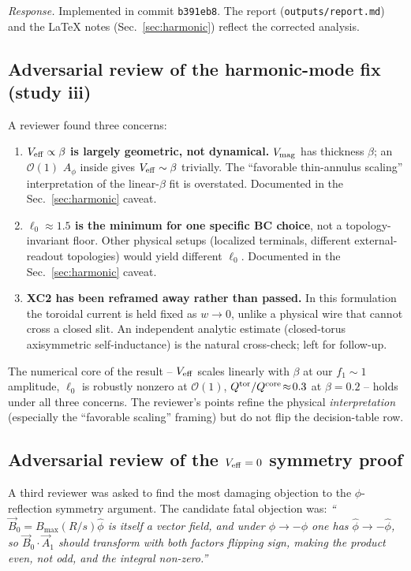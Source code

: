 \documentclass[11pt]{article}
\begin{document}
\emph{Response.}  Implemented in commit \texttt{b391eb8}.  The
report (\texttt{outputs/report.md}) and the LaTeX notes
(Sec.~\ref{sec:harmonic}) reflect the corrected analysis.

\subsection*{Adversarial review of the harmonic-mode fix (study iii)}

A reviewer found three concerns:
\begin{enumerate}
\item \textbf{$V_{\rm eff}\propto\beta$ is largely geometric, not
dynamical.}  $V_{\rm mag}$ has thickness $\beta$; an $\mathcal O(1)$
$A_\phi$ inside gives $V_{\rm eff}\sim\beta$ trivially.  The
``favorable thin-annulus scaling'' interpretation of the linear-$\beta$
fit is overstated.  Documented in the Sec.~\ref{sec:harmonic} caveat.
\item \textbf{$\ell_0\approx 1.5$ is the minimum for one specific
BC choice}, not a topology-invariant floor.  Other physical setups
(localized terminals, different external-readout topologies) would
yield different $\ell_0$.  Documented in the Sec.~\ref{sec:harmonic}
caveat.
\item \textbf{XC2 has been reframed away rather than passed.}  In
this formulation the toroidal current is held fixed as $w\to 0$,
unlike a physical wire that cannot cross a closed slit.  An
independent analytic estimate (closed-torus axisymmetric
self-inductance) is the natural cross-check; left for follow-up.
\end{enumerate}

The numerical core of the result -- $V_{\rm eff}$ scales linearly
with $\beta$ at our $f_1\!\sim\!1$ amplitude, $\ell_0$ is robustly
nonzero at $\mathcal O(1)$, $Q^{\rm tor}/Q^{\rm core}\!\approx\!0.3$
at $\beta\!=\!0.2$ -- holds under all three concerns.  The reviewer's
points refine the physical \emph{interpretation} (especially the
``favorable scaling'' framing) but do not flip the decision-table row.

\subsection*{Adversarial review of the $V_{\rm eff}=0$ symmetry proof}

A third reviewer was asked to find the most damaging objection to the
$\phi$-reflection symmetry argument.  The candidate fatal objection
was: \emph{``$\vec B_0=B_{\max}(R/s)\hat\phi$ is itself a vector
field, and under $\phi\to-\phi$ one has $\hat\phi\to-\hat\phi$, so
$\vec B_0\cdot\vec A_1$ should transform with both factors flipping
sign, making the product even, not odd, and the integral non-zero.''}
\end{document}
